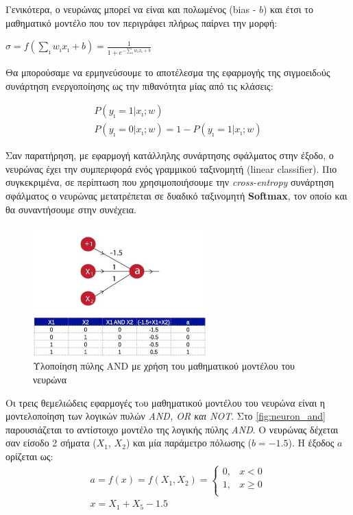 Γενικότερα, ο νευρώνας μπορεί να είναι και πολωμένος (bias - $b$) και έτσι το μαθηματικό
μοντέλο που τον περιγράφει πλήρως παίρνει την μορφή:
\begin{center}
\begin{large}
  $\sigma = f(\sum_{\imath}w_{\imath}x_{\imath} + b) = \frac{1}{1 + e^{-\sum_{\imath}w_{\imath}x_{\imath} + b}}$
\end{large}
\end{center}
Θα μπορούσαμε να ερμηνεύσουμε το αποτέλεσμα της εφαρμογής της
σιγμοειδoύς συνάρτηση ενεργοποίησης ως την πιθανότητα μίας από τις κλάσεις:
\begin{large}
\begin{gather*}
  P(y_{\imath} = 1 | x_{\imath};w) \\
  P(y_{\imath} = 0 | x_{\imath};w) = 1 - P(y_{\imath} = 1 | x_{\imath};w)
\end{gather*}
\end{large}

Σαν παρατήρηση, με εφαρμογή κατάλληλης
συνάρτησης σφάλματος στην έξοδο, ο νευρώνας έχει την συμπεριφορά ενός γραμμικού ταξινομητή
(linear classifier). Πιο συγκεκριμένα, σε περίπτωση που χρησιμοποιήσουμε την \emph{cross-entropy}
συνάρτηση σφάλματος ο νευρώνας μετατρέπεται σε δυαδικό ταξινομητή \textbf{Softmax},
τον οποίο και θα συναντήσουμε στην συνέχεια.

\begin{figure}[!ht]
  \centering
  \includegraphics[width=0.6\textwidth]{./images/chapter3/perceptron_and.jpg}
  \caption[Υλοποίηση πύλης AND με χρήση του μαθηματικού μοντέλου του νευρώνα]{Υλοποίηση πύλης AND με χρήση του μαθηματικού μοντέλου του νευρώνα}
  \label{fig:neuron_and}
\end{figure}

Οι τρεις θεμελιώδεις εφαρμογές τoυ μαθηματικού μοντέλου του νευρώνα είναι η
μοντελοποίηση των λογικών πυλών \emph{AND, OR και NOT}. Στο \autoref{fig:neuron_and}
παρουσιάζεται το αντίστοιχο μοντέλο της λογικής πύλης \emph{AND}. Ο νευρώνας
δέχεται σαν είσοδο 2 σήματα ($X_{1}$,  $X_{2}$) και μία παράμετρο πόλωσης ($b=-1.5$).
Η έξοδος $a$ ορίζεται ως:
\begin{gather*}
  a = f(x) = f(X_{1}, X_{2}) =
  \begin{cases}
    0, & x < 0 \\
    1, & x \geq 0 \\
  \end{cases} \\
   x = X_{1} + X_{5} - 1.5
\end{gather*}


